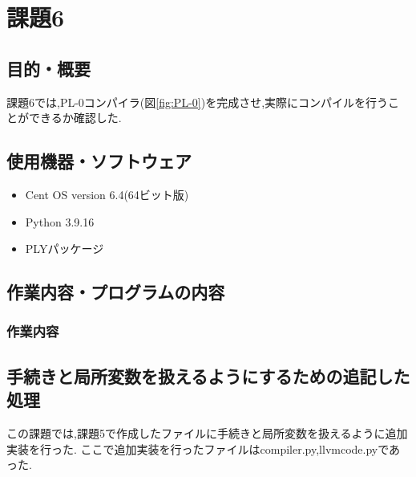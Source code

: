 \documentclass[main]{subfiles}
\begin{document}
\chapter{課題6}
\section{目的・概要}
課題6では,PL-0コンパイラ(図\ref{fig:PL-0})を完成させ,実際にコンパイルを行うことができるか確認した.

\section{使用機器・ソフトウェア}
\begin{itemize}
    \item Cent OS version 6.4(64ビット版)
    \item Python 3.9.16
    \item PLYパッケージ
\end{itemize}

\section{作業内容・プログラムの内容}
\subsection{作業内容}
\section{手続きと局所変数を扱えるようにするための追記した処理}
この課題では,課題5で作成したファイルに手続きと局所変数を扱えるように追加実装を行った.
ここで追加実装を行ったファイルはcompiler.py,llvmcode.pyであった.
\end{document}
